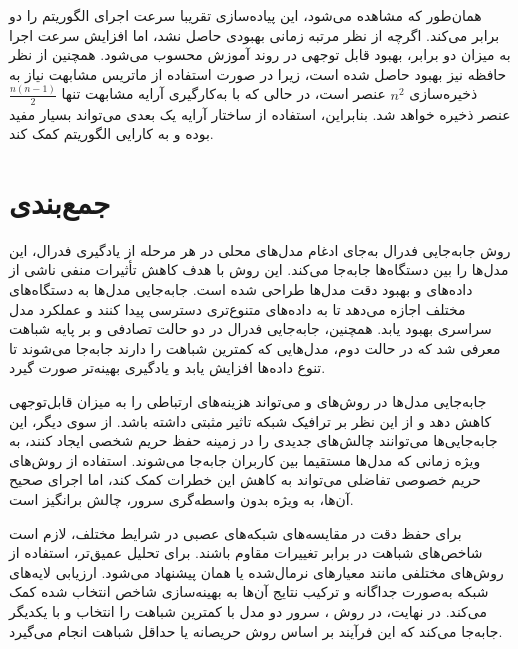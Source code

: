 همان‌طور که مشاهده می‌شود، این پیاده‌سازی تقریبا سرعت اجرای الگوریتم را دو برابر می‌کند. اگرچه از نظر مرتبه زمانی بهبودی حاصل نشد، اما افزایش سرعت اجرا به میزان دو برابر، بهبود قابل توجهی در روند آموزش محسوب می‌شود. همچنین از نظر حافظه نیز بهبود حاصل شده است، زیرا در صورت استفاده از ماتریس مشابهت نیاز به ذخیره‌سازی \(n^2\) عنصر است، در حالی که با به‌کارگیری آرایه مشابهت تنها \(\frac{n(n-1)}{2}\) عنصر ذخیره خواهد شد. بنابراین، استفاده از ساختار آرایه یک بعدی می‌تواند بسیار مفید بوده و به کارایی الگوریتم کمک کند.




\section{جمع‌بندی}

روش جابه‌جایی فدرال به‌جای ادغام مدل‌های محلی در هر مرحله از یادگیری فدرال، این مدل‌ها را بین دستگاه‌ها جابه‌جا می‌کند. این روش با هدف کاهش تأثیرات منفی ناشی از داده‌های
و بهبود دقت مدل‌ها طراحی شده است. جابه‌جایی مدل‌ها به دستگاه‌های مختلف اجازه می‌دهد تا به داده‌های متنوع‌تری دسترسی پیدا کنند و عملکرد مدل سراسری بهبود یابد. همچنین، جابه‌جایی فدرال در دو حالت تصادفی و بر پایه شباهت معرفی شد که در حالت دوم، مدل‌هایی که کمترین شباهت را دارند جابه‌جا می‌شوند تا تنوع داده‌ها افزایش یابد و یادگیری بهینه‌تر صورت گیرد.


جابه‌جایی مدل‌ها در روش‌های
و
می‌تواند هزینه‌های ارتباطی را به میزان قابل‌توجهی کاهش دهد و از این نظر بر ترافیک شبکه تاثیر مثبتی داشته باشد. از سوی دیگر، این جابه‌جایی‌ها می‌توانند چالش‌های جدیدی را در زمینه حفظ حریم شخصی ایجاد کنند، به ویژه زمانی که مدل‌ها مستقیما بین کاربران جابه‌جا می‌شوند. استفاده از روش‌های حریم خصوصی تفاضلی می‌تواند به کاهش این خطرات کمک کند، اما اجرای صحیح آن‌ها، به ویژه بدون واسطه‌گری سرور، چالش ‌برانگیز است.


برای حفظ دقت در مقایسه‌های شبکه‌های عصبی در شرایط مختلف، لازم است شاخص‌های شباهت در برابر تغییرات مقاوم باشند. برای تحلیل عمیق‌تر، استفاده از روش‌های مختلفی مانند معیارهای نرمال‌شده یا همان
پیشنهاد می‌شود. ارزیابی لایه‌های شبکه به‌صورت جداگانه و ترکیب نتایج آن‌ها به بهینه‌سازی شاخص انتخاب شده کمک می‌کند. در نهایت، در روش
%
، سرور دو مدل با کمترین شباهت را انتخاب و با یکدیگر جابه‌جا می‌کند که این فرآیند بر اساس روش حریصانه یا حداقل شباهت انجام می‌گیرد.

